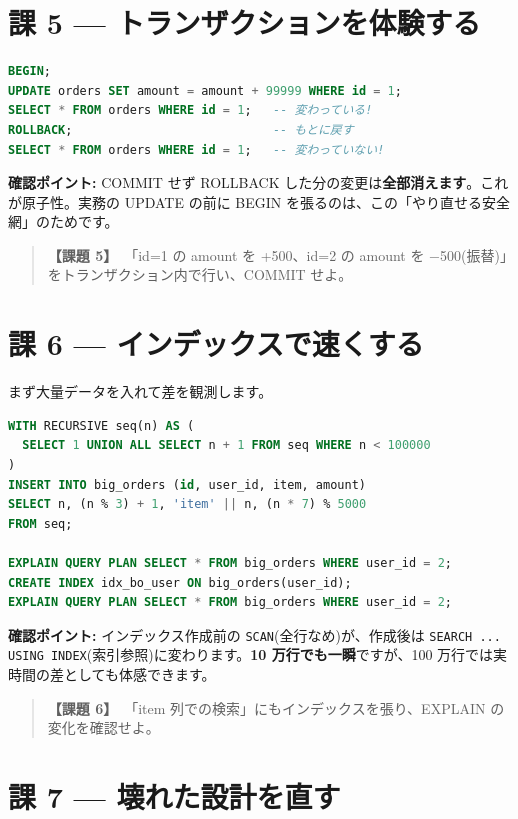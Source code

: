 \documentclass{article}
\begin{document}
\section{課 5 — トランザクションを体験する}

\begin{lstlisting}[language=SQL]
BEGIN;
UPDATE orders SET amount = amount + 99999 WHERE id = 1;
SELECT * FROM orders WHERE id = 1;   -- 変わっている!
ROLLBACK;                            -- もとに戻す
SELECT * FROM orders WHERE id = 1;   -- 変わっていない!
\end{lstlisting}

\textbf{確認ポイント:} COMMIT せず ROLLBACK した分の変更は\textbf{全部消えます}。これが原子性。実務の UPDATE の前に BEGIN を張るのは、この「やり直せる安全網」のためです。

\begin{quote}
\textbf{【課題 5】}\ 「id=1 の amount を +500、id=2 の amount を −500(振替)」をトランザクション内で行い、COMMIT せよ。
\end{quote}

\section{課 6 — インデックスで速くする}

まず大量データを入れて差を観測します。

\begin{lstlisting}[language=SQL]
WITH RECURSIVE seq(n) AS (
  SELECT 1 UNION ALL SELECT n + 1 FROM seq WHERE n < 100000
)
INSERT INTO big_orders (id, user_id, item, amount)
SELECT n, (n % 3) + 1, 'item' || n, (n * 7) % 5000
FROM seq;

EXPLAIN QUERY PLAN SELECT * FROM big_orders WHERE user_id = 2;
CREATE INDEX idx_bo_user ON big_orders(user_id);
EXPLAIN QUERY PLAN SELECT * FROM big_orders WHERE user_id = 2;
\end{lstlisting}

\textbf{確認ポイント:} インデックス作成前の \texttt{SCAN}(全行なめ)が、作成後は \texttt{SEARCH ... USING INDEX}(索引参照)に変わります。\textbf{10 万行でも一瞬}ですが、100 万行では実時間の差としても体感できます。

\begin{quote}
\textbf{【課題 6】}\ 「item 列での検索」にもインデックスを張り、EXPLAIN の変化を確認せよ。
\end{quote}

\section{課 7 — 壊れた設計を直す}
\end{document}
